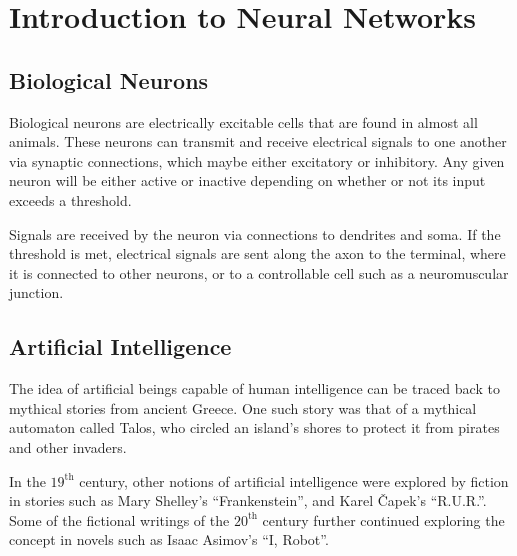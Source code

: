 \chapter{Introduction to Neural Networks}


\section{Biological Neurons}

Biological neurons are electrically excitable cells that are found in almost all
animals.
These neurons can transmit and receive electrical signals to one another via
synaptic connections, which maybe either excitatory or inhibitory.
Any given neuron will be either active or inactive depending on whether or not
its input exceeds a threshold.

\begin{center}
    
\end{center}

Signals are received by the neuron via connections to dendrites and soma.
If the threshold is met, electrical signals are sent along the axon to the
terminal, where it is connected to other neurons, or to a controllable cell such
as a neuromuscular junction.




\section{Artificial Intelligence}

The idea of artificial beings capable of human intelligence can be traced back
to mythical stories from ancient Greece.
One such story was that of a mythical automaton called Talos, who circled an
island's shores to protect it from pirates and other invaders.

In the $19^\text{th}$ century, other notions of artificial intelligence were
explored by fiction in stories such as Mary Shelley's ``Frankenstein'', and
Karel \v{C}apek's ``R.U.R.''.
Some of the fictional writings of the $20^\text{th}$ century further continued
exploring the concept in novels such as Isaac Asimov's ``I, Robot''.




